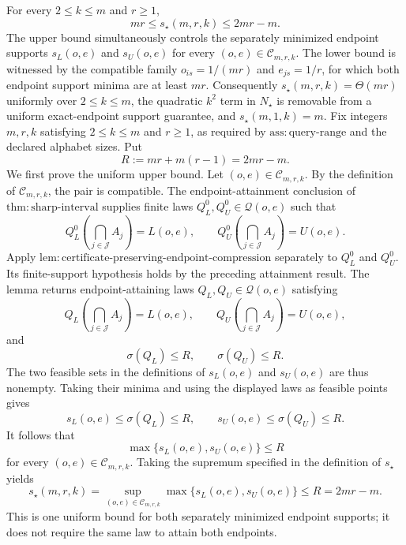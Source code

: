 For every \(2\leq k\leq m\) and \(r\geq1\),
\[
mr\leq s_\star(m,r,k)\leq 2mr-m.
\]
The upper bound simultaneously controls the separately minimized endpoint supports \(s_L(o,e)\) and \(s_U(o,e)\) for every \((o,e)\in\mathcal C_{m,r,k}\).  The lower bound is witnessed by the compatible family \(o_{is}=1/(mr)\) and \(e_{js}=1/r\), for which both endpoint support minima are at least \(mr\).  Consequently \(s_\star(m,r,k)=\Theta(mr)\) uniformly over \(2\leq k\leq m\), the quadratic \(k^2\) term in \(N_\star\) is removable from a uniform exact-endpoint support guarantee, and \(s_\star(m,1,k)=m\).
Fix integers \(m,r,k\) satisfying \(2\leq k\leq m\) and \(r\geq1\), as required by \(\mathrm{ass{:}query\mbox{-}range}\) and the declared alphabet sizes.  Put
\[
R:=mr+m(r-1)=2mr-m.
\]
We first prove the uniform upper bound.  Let \((o,e)\in\mathcal C_{m,r,k}\).  By the definition of \(\mathcal C_{m,r,k}\), the pair is compatible.  The endpoint-attainment conclusion of \(\mathrm{thm{:}sharp\mbox{-}interval}\) supplies finite laws \(Q_L^0,Q_U^0\in\mathcal Q(o,e)\) such that
\[
Q_L^0\!\left(\bigcap_{j\in\mathcal J}A_j\right)=L(o,e),
\qquad
Q_U^0\!\left(\bigcap_{j\in\mathcal J}A_j\right)=U(o,e).
\]
Apply \(\mathrm{lem{:}certificate\mbox{-}preserving\mbox{-}endpoint\mbox{-}compression}\) separately to \(Q_L^0\) and \(Q_U^0\).  Its finite-support hypothesis holds by the preceding attainment result.  The lemma returns endpoint-attaining laws \(Q_L,Q_U\in\mathcal Q(o,e)\) satisfying
\[
Q_L\!\left(\bigcap_{j\in\mathcal J}A_j\right)=L(o,e),
\qquad
Q_U\!\left(\bigcap_{j\in\mathcal J}A_j\right)=U(o,e),
\]
and
\[
\sigma(Q_L)\leq R,
\qquad
\sigma(Q_U)\leq R.
\]
The two feasible sets in the definitions of \(s_L(o,e)\) and \(s_U(o,e)\) are thus nonempty.  Taking their minima and using the displayed laws as feasible points gives
\[
s_L(o,e)\leq\sigma(Q_L)\leq R,
\qquad
s_U(o,e)\leq\sigma(Q_U)\leq R.
\]
It follows that
\[
\max\{s_L(o,e),s_U(o,e)\}\leq R
\]
for every \((o,e)\in\mathcal C_{m,r,k}\).  Taking the supremum specified in the definition of \(s_\star\) yields
\[
s_\star(m,r,k)
=\sup_{(o,e)\in\mathcal C_{m,r,k}}
  \max\{s_L(o,e),s_U(o,e)\}
\leq R=2mr-m.
\]
This is one uniform bound for both separately minimized endpoint supports; it does not require the same law to attain both endpoints.

